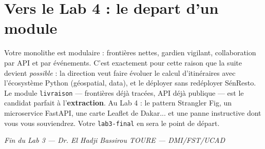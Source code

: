 \documentclass[a4paper,11pt]{article}
\begin{document}
\section{Vers le Lab 4 : le depart d'un module}

Votre monolithe est modulaire : frontières nettes, gardien vigilant,
collaboration par API et par événements. C'est exactement pour cette
raison que la suite devient \emph{possible} : la direction veut faire
évoluer le calcul d'itinéraires avec l'écosystème Python (géospatial,
data), et le déployer sans redéployer SénResto. Le module
\texttt{livraison} --- frontières déjà tracées, API déjà publique --- est
le candidat parfait à l'\textbf{extraction}. Au Lab 4 : le pattern
Strangler Fig, un microservice FastAPI, une carte Leaflet de Dakar...
et une panne instructive dont vous vous souviendrez. Votre
\texttt{lab3-final} en sera le point de départ.

\vspace{1em}
\begin{center}
\textit{Fin du Lab 3 --- Dr. El Hadji Bassirou TOURE --- DMI/FST/UCAD}
\end{center}
\end{document}
